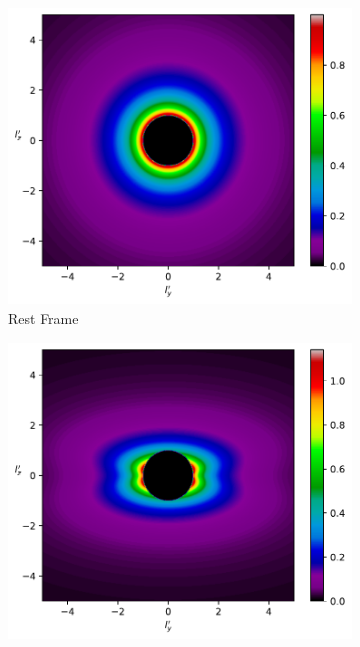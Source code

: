 \begin{figure}[H]
	\centering
	\begin{subfigure}{0.45\textwidth}
		\centering
		\includegraphics[width=\textwidth]{images/pdf/Density_of_Light_from_Rest_Source.pdf}
		\caption{Rest Frame}
		\label{subfig_1: light emitted from a source's rate of change of vector density norm}
	\end{subfigure}
	\begin{subfigure}{0.45\textwidth}
		\centering
		\includegraphics[width=\textwidth]{images/pdf/Rate_of_Change_of_Vector_Density_norm_of_Light_from_Moving_Source.pdf}

\end{subfigure}
\end{figure}
